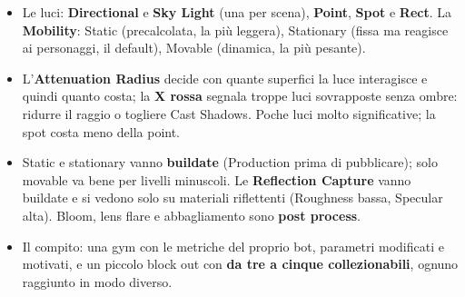 \begin{itemize}
        dai \textbf{Brush Settings} e non dalla scala, Hollow e Wall Thickness,
        \textbf{Additive} e \textbf{Subtractive} per bucare. Sono pesanti: \textbf{Create
        Static Mesh}, in una cartella \emph{Blockout Assets}. Il Brush Editing modifica
        vertici, edge e facce, ma i Brush Settings ricostruiscono la forma.
  \item Le luci: \textbf{Directional} e \textbf{Sky Light} (una per scena), \textbf{Point},
        \textbf{Spot} e \textbf{Rect}. La \textbf{Mobility}: Static (precalcolata, la più
        leggera), Stationary (fissa ma reagisce ai personaggi, il default), Movable
        (dinamica, la più pesante).
  \item L'\textbf{Attenuation Radius} decide con quante superfici la luce interagisce e
        quindi quanto costa; la \textbf{X rossa} segnala troppe luci sovrapposte senza
        ombre: ridurre il raggio o togliere Cast Shadows. Poche luci molto significative;
        la spot costa meno della point.
  \item Static e stationary vanno \textbf{buildate} (Production prima di pubblicare); solo
        movable va bene per livelli minuscoli. Le \textbf{Reflection Capture} vanno buildate
        e si vedono solo su materiali riflettenti (Roughness bassa, Specular alta). Bloom,
        lens flare e abbagliamento sono \textbf{post process}.
  \item Il compito: una gym con le metriche del proprio bot, parametri modificati e
        motivati, e un piccolo block out con \textbf{da tre a cinque collezionabili},
        ognuno raggiunto in modo diverso.
\end{itemize}
